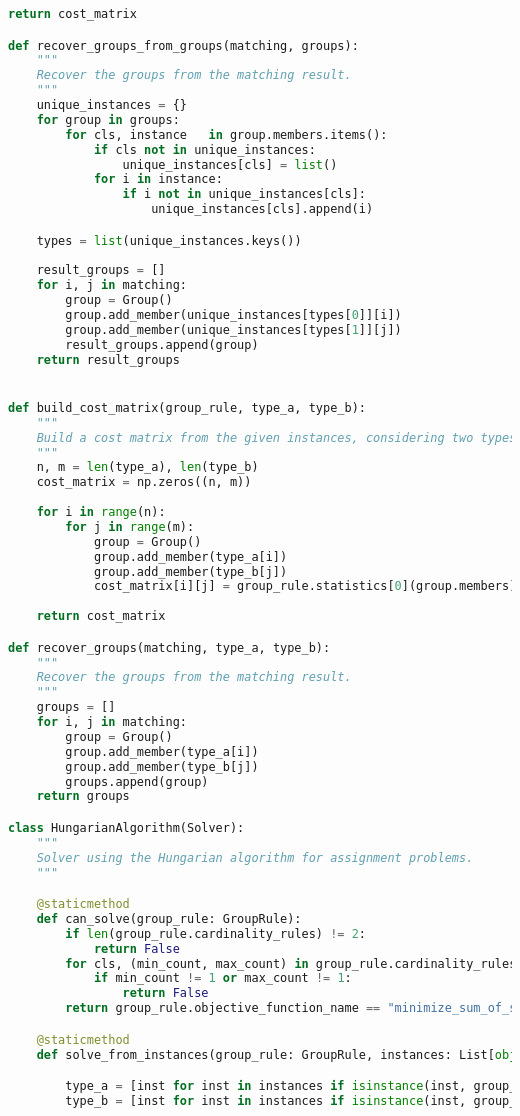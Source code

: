 \begin{apendicesenv}
\begin{lstlisting}[language=Python, caption={Hungarian Algorithm Solver Source Code}]
    return cost_matrix

def recover_groups_from_groups(matching, groups):
    """
    Recover the groups from the matching result.
    """
    unique_instances = {}
    for group in groups:
        for cls, instance   in group.members.items():
            if cls not in unique_instances:
                unique_instances[cls] = list()
            for i in instance:
                if i not in unique_instances[cls]:
                    unique_instances[cls].append(i)

    types = list(unique_instances.keys())
    
    result_groups = []
    for i, j in matching:
        group = Group()
        group.add_member(unique_instances[types[0]][i])
        group.add_member(unique_instances[types[1]][j])
        result_groups.append(group)
    return result_groups


def build_cost_matrix(group_rule, type_a, type_b):
    """
    Build a cost matrix from the given instances, considering two types of objects.
    """
    n, m = len(type_a), len(type_b)
    cost_matrix = np.zeros((n, m))
    
    for i in range(n):
        for j in range(m):
            group = Group()
            group.add_member(type_a[i])
            group.add_member(type_b[j])
            cost_matrix[i][j] = group_rule.statistics[0](group.members)
    
    return cost_matrix

def recover_groups(matching, type_a, type_b):
    """
    Recover the groups from the matching result.
    """
    groups = []
    for i, j in matching:
        group = Group()
        group.add_member(type_a[i])
        group.add_member(type_b[j])
        groups.append(group)
    return groups

class HungarianAlgorithm(Solver):
    """
    Solver using the Hungarian algorithm for assignment problems.
    """

    @staticmethod
    def can_solve(group_rule: GroupRule):
        if len(group_rule.cardinality_rules) != 2:
            return False
        for cls, (min_count, max_count) in group_rule.cardinality_rules.items():
            if min_count != 1 or max_count != 1:
                return False
        return group_rule.objective_function_name == "minimize_sum_of_single_statistic"

    @staticmethod
    def solve_from_instances(group_rule: GroupRule, instances: List[object]):

        type_a = [inst for inst in instances if isinstance(inst, group_rule.types[0])]
        type_b = [inst for inst in instances if isinstance(inst, group_rule.types[1])]


\end{lstlisting}
\end{apendicesenv}
